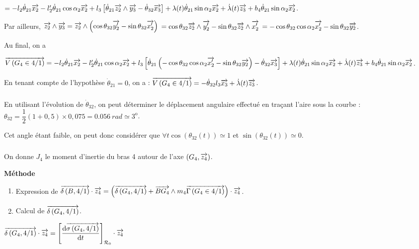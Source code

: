 \documentclass[10pt,fleqn]{article} %
\begin{document}
$= 
-l_2 \dot{\theta}_{21}\overrightarrow{x_2} 
-l_2'\dot{\theta}_{21}\cos \alpha_2\overrightarrow{x_2}+
l_3\left[ \dot{\theta}_{21}\overrightarrow{z_2}\wedge \overrightarrow{y_3}-\dot{\theta}_{32}\overrightarrow{x_3}  \right]+
\lambda(t) \dot{\theta}_{21}\sin \alpha_2\overrightarrow{x_2} +
\dot{\lambda}(t)\overrightarrow{z_3}+ b_4\dot{\theta}_{21}\sin \alpha_2\overrightarrow{x_2}$. 


Par ailleurs, 
$\overrightarrow{z_2}\wedge \overrightarrow{y_3}=\overrightarrow{z_2}\wedge \left( \cos \theta_{32} \overrightarrow{y_2'} -\sin \theta_{32} \overrightarrow{x_2'}  \right)$
$= \cos \theta_{32} \overrightarrow{z_2}\wedge  \overrightarrow{y_2'} -\sin \theta_{32} \overrightarrow{z_2}\wedge\overrightarrow{x_2'}  $
$= -\cos \theta_{32} \cos \alpha_2 \overrightarrow{x_2'} -\sin \theta_{32} \overrightarrow{y_2}  $.

Au final, on a 

$\overrightarrow{V\left( {G_4} \in {4}/{1}\right)}=
-l_2 \dot{\theta}_{21}\overrightarrow{x_2} 
-l_2'\dot{\theta}_{21}\cos \alpha_2\overrightarrow{x_2}+
l_3\left[ \dot{\theta}_{21}\left(-\cos \theta_{32} \cos \alpha_2 \overrightarrow{x_2'} -\sin \theta_{32} \overrightarrow{y_2}  \right)-\dot{\theta}_{32}\overrightarrow{x_3}  \right]+
\lambda(t) \dot{\theta}_{21}\sin \alpha_2\overrightarrow{x_2} +
\dot{\lambda}(t)\overrightarrow{z_3}+ b_4\dot{\theta}_{21}\sin \alpha_2\overrightarrow{x_2}$.


En tenant compte de l'hypothèse $\dot{\theta}_{21}=0$, on a : $\overrightarrow{V\left( {G_4} \in {4}/{1}\right)}=
-\dot{\theta}_{32}l_3\overrightarrow{x_3}  + \dot{\lambda}(t)\overrightarrow{z_3}$.


\subparagraph{}%
En utilisant l'évolution de $\dot{\theta}_{32}$, on peut déterminer le déplacement angulaire effectué en traçant l'aire sous la courbe :
$\theta_{32}=\dfrac{1}{2}\left( 1+0,5\right)\times 0,075 =\SI{0,056}{rad}\simeq 3^{\text{o}}$.

Cet angle étant faible, on peut donc considérer que $\forall t \cos \left(\theta_{32}(t)\right)\simeq 1$ et $\sin\left(\theta_{32}(t)\right)\simeq 0$.

\subparagraph{}%

On donne $J_4$ le moment d'inertie du bras 4 autour de l'axe $\left(G_4,\overrightarrow{z_4}\right)$.

\textbf{Méthode}
\begin{enumerate}
\item Expression de $\overrightarrow{\delta \left( {B}, {4} /{1}\right)}\cdot\overrightarrow{z_4} = \left( \overrightarrow{\delta \left( {G_4}, {4} /{1}\right)} + \overrightarrow{BG_4}\wedge m_4 \overrightarrow{\Gamma \left( {G_4} \in {4}/{1}\right)}\right)\cdot\overrightarrow{z_4}$.
\item Calcul de $\overrightarrow{\delta \left( {G_4}, {4} /{1}\right)}$.
\end{enumerate}

$\overrightarrow{\delta \left( {G_4}, {4} /{1}\right)} \cdot\overrightarrow{z_4} = \left[ \dfrac{\text{d} \overrightarrow{\sigma \left( {G_4}, {4} /{1}\right)}}{\text{d} t} \right]_{\mathcal{R}_{0}}\cdot\overrightarrow{z_4}$
\end{document}
